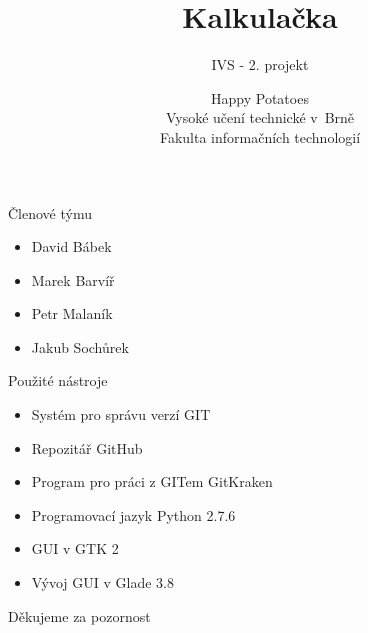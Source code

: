 \documentclass{beamer}
\begin{document}
\begin{frame}
\title{Kalkulačka}
\subtitle{IVS - 2. projekt}
\author{Happy Potatoes \medskip\\Vysoké učení technické v~Brně\\Fakulta informačních technologií}

\maketitle
\end{frame}

\begin{frame}{Členové týmu}
\begin{itemize}
\item David Bábek
\item Marek Barvíř
\item Petr Malaník
\item Jakub Sochůrek
\end{itemize}
\end{frame}

\begin{frame}{Použité nástroje}
\begin{itemize}
\begin{figure}
\raggedleft
{}
\label{obr1}
\end{figure}
\item Systém pro správu verzí GIT
\item Repozitář GitHub
\item Program pro práci z GITem GitKraken
\item Programovací jazyk Python 2.7.6
\begin{wrapfigure}\hfill
\raggedleft
{}
\label{obr2}
\end{wrapfigure}
\item GUI v GTK 2
\item Vývoj GUI v Glade 3.8
\begin{figure}
\raggedleft
{}
\label{obr1}
\end{figure}


\end{itemize}

\end{frame}
\begin{frame}
\begin{center}
\Large{Děkujeme za pozornost}
\end{center}
\end{frame}
\end{document}
